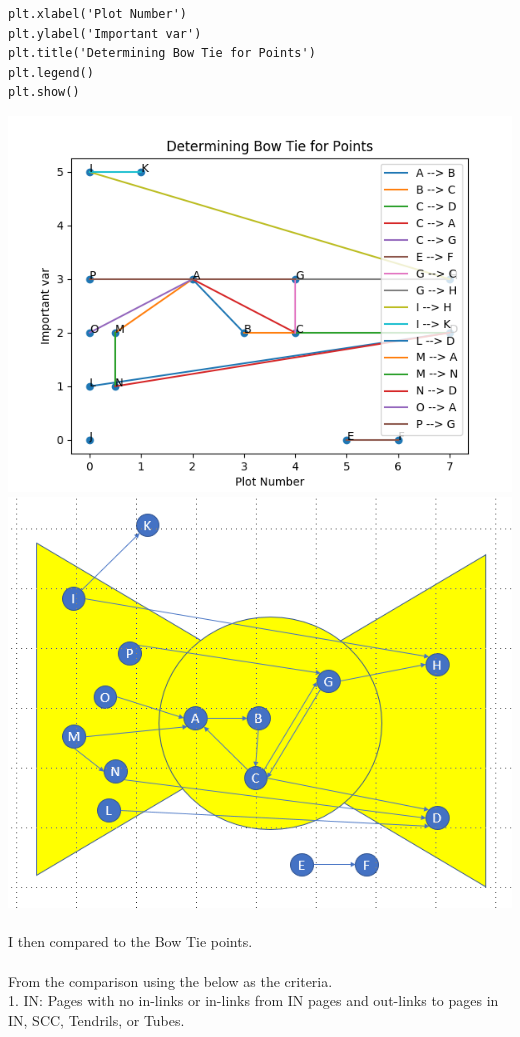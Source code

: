 \documentclass[10pt,letterpaper]{article}
\begin{document}
\begin{lstlisting}
plt.xlabel('Plot Number')
plt.ylabel('Important var')
plt.title('Determining Bow Tie for Points')
plt.legend()
plt.show()
\end{lstlisting}
\includegraphics[scale=.4]{Figure_1.png} 
\includegraphics[scale=.4]{question3.png} 
\\
\\
I then compared to the Bow Tie points.\\
\\
From the comparison using the below as the criteria.\\
    1. IN: Pages with no in-links or in-links from IN pages and out-links to pages in IN, SCC, Tendrils, or Tubes.\\ 
\end{document}
